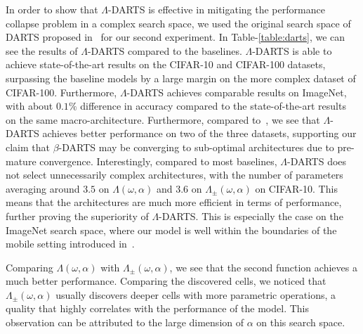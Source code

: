 \documentclass{article} \usepackage{fancyhdr, iclr2023_conference, times}
\newcommand{\mydarts}{$\Lambda$-DARTS\xspace}
\begin{document}
\par In order to show that \mydarts is effective in mitigating the performance collapse problem in a complex search space, we used the original search space of DARTS proposed in~\citep{DBLP:conf/iclr/LiuSY19} for our second experiment. In Table-\ref{table:darts}, we can see the results of \mydarts compared to the baselines. \mydarts is able to achieve state-of-the-art results on the CIFAR-10 and CIFAR-100 datasets, surpassing the baseline models by a large margin on the more complex dataset of CIFAR-100. Furthermore, \mydarts achieves comparable results on ImageNet, with about $0.1\%$ difference in accuracy compared to the state-of-the-art results on the same macro-architecture. Furthermore, compared to~\citep{DBLP:journals/corr/abs-2203-01665}, we see that \mydarts achieves better performance on two of the three datasets, supporting our claim that $\beta$-DARTS may be converging to sub-optimal architectures due to pre-mature convergence. Interestingly, compared to most baselines, \mydarts does not select unnecessarily complex architectures, with the number of parameters averaging around $3.5$ on $\Lambda(\omega, \alpha)$ and $3.6$ on $\Lambda_\pm(\omega, \alpha)$ on CIFAR-10. This means that the architectures are much more efficient in terms of performance, further proving the superiority of \mydarts. This is especially the case on the ImageNet search space, where our model is well within the boundaries of the mobile setting introduced in~\citep{DBLP:conf/iclr/LiuSY19}. 
\par Comparing $\Lambda(\omega, \alpha)$ with $\Lambda_\pm(\omega, \alpha)$, we see that the second function achieves a much better performance. Comparing the discovered cells, we noticed that $\Lambda_\pm(\omega, \alpha)$ usually discovers deeper cells with more parametric operations, a quality that highly correlates with the performance of the model. This observation can be attributed to the large dimension of $\alpha$ on this search space.
\end{document}
